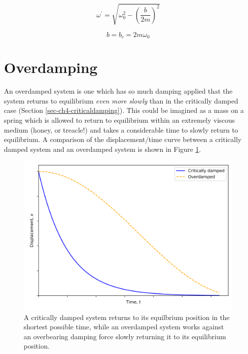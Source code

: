 \documentclass[
]{book}
\begin{document}
\begin{equation}
\omega^\prime = \sqrt{\omega_0^2 - \left(\frac{b}{2m}\right)^2}
\label{eq:ch4-dampfrequency1}
\end{equation}

\begin{equation}
b = b_c = 2m\omega_0
\label{eq:ch4-criticaldamp1}
\end{equation}

\hypertarget{sec-ch4-overdamping}{%
\section{Overdamping}\label{sec-ch4-overdamping}}

An overdamped system is one which has so much damping applied that the system returns to equilibrium \emph{even more slowly} than in the critically damped case (Section \ref{sec-ch4-criticaldamping}). This could be imagined as a mass on a spring which is allowed to return to equilibrium within an extremely viscous medium (honey, or treacle!) and takes a considerable time to slowly return to equilibrium. A comparison of the displacement/time curve between a critically damped system and an overdamped system is shown in Figure \ref{fig:ch4-critvsoverdamped1}.

\begin{figure}

{\centering \includegraphics[width=0.7\linewidth]{visualisations/ch4-critoverdamp1} 

}

\caption{A critically damped system returns to its equilbrium position in the shortest possible time, while an overdamped system works against an overbearing damping force slowly returning it to its equilibrium position.}\label{fig:ch4-critvsoverdamped1}
\end{figure}
\end{document}
